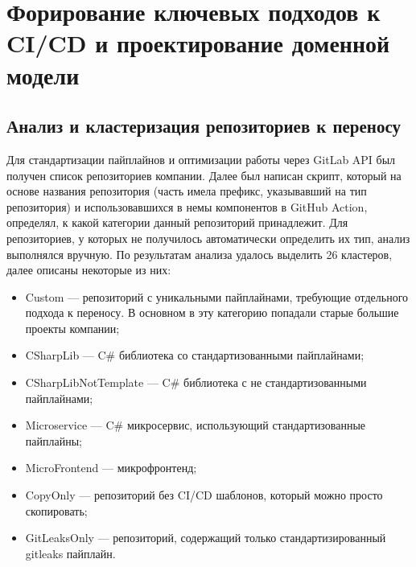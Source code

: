 \chapter{Форирование ключевых подходов к CI/CD и проектирование доменной модели} \label{ch:ch2}

\section{Анализ и кластеризация репозиториев к переносу} \label{sec:repository-analysis}
Для стандартизации пайплайнов и оптимизации работы через GitLab API был получен список репозиториев компании.
Далее был написан скрипт,
который на основе названия репозитория (часть имела префикс, указывавший на тип репозитория) и использовавшихся в немы компонентов в GitHub Action,
определял, к какой категории данный репозиторий принадлежит.
Для репозиториев, у которых не получилось автоматически определить их тип, анализ выполнялся вручную.
По результатам анализа удалось выделить 26 кластеров, далее описаны некоторые из них:
\begin{itemize}
  \item Custom — репозиторий с уникальными пайплайнами, требующие отдельного подхода к переносу.
        В основном в эту категорию попадали старые большие проекты компании;
  \item CSharpLib — C\# библиотека со стандартизованными пайплайнами;
  \item CSharpLibNotTemplate — C\# библиотека с не стандартизованными пайплайнами;
  \item Microservice — C\# микросервис, использующий стандартизованные пайплайны;
  \item MicroFrontend — микрофронтенд;
  \item CopyOnly — репозиторий без CI/CD шаблонов, который можно просто скопировать;
  \item GitLeaksOnly — репозиторий, содержащий только стандартизированный gitleaks пайплайн.
\end{itemize}

